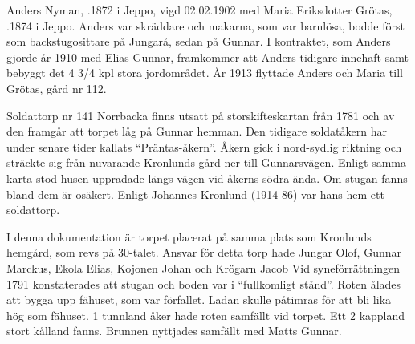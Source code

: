 Anders Nyman, .1872 i Jeppo, vigd 02.02.1902 med Maria Eriksdotter Grötas, .1874 i Jeppo. Anders var skräddare och makarna, som var barnlösa, bodde först som backstugosittare på Jungarå, sedan på Gunnar. I kontraktet, som Anders gjorde år 1910 med Elias Gunnar, framkommer att Anders tidigare innehaft samt bebyggt det 4 3/4 kpl stora jordområdet. År 1913 flyttade Anders och Maria till Grötas, gård nr 112.


Soldattorp nr 141 Norrbacka finns utsatt på storskifteskartan från 1781 och av den framgår att torpet låg på Gunnar hemman. Den tidigare soldatåkern har under senare tider kallats ``Präntas-åkern''. Åkern gick i nord-sydlig riktning och sträckte sig från nuvarande Kronlunds gård ner till Gunnarsvägen. Enligt samma karta stod husen uppradade längs vägen vid åkerns södra ända. Om stugan fanns bland dem är osäkert. Enligt Johannes Kronlund (1914-86) var hans hem ett soldattorp.

I denna dokumentation är torpet placerat på samma plats som Kronlunds hemgård, som revs på 30-talet. Ansvar för detta torp hade Jungar Olof, Gunnar Marckus, Ekola Elias, Kojonen Johan och Krögarn Jacob Vid syneförrättningen 1791 konstaterades att stugan och boden var i ``fullkomligt stånd''. Roten ålades att bygga upp fähuset, som var	förfallet. Ladan skulle påtimras för att bli lika hög som fähuset. 1 tunnland åker hade roten samfällt vid torpet. Ett 2 kappland stort kålland fanns. Brunnen nyttjades samfällt med Matts Gunnar.


